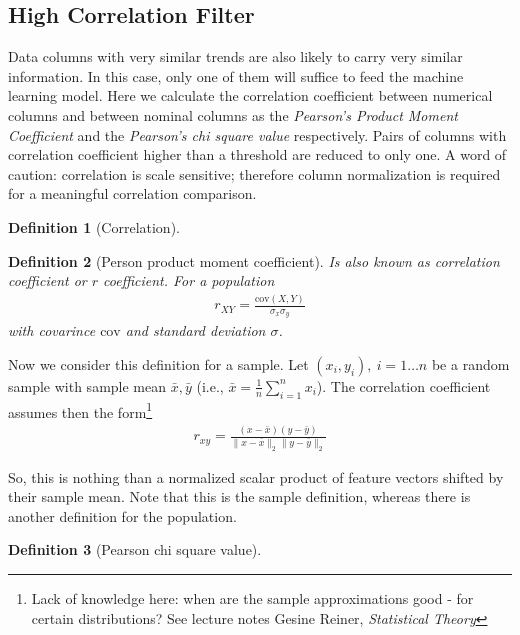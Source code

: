 \documentclass[10pt,a4paper]{article}
\newtheorem{definition}{Definition}
\begin{document}
\subsection*{High Correlation Filter}
Data columns with very similar trends are also likely to carry very similar information. In this case, only one of them will suffice to feed the machine learning model. Here we calculate the correlation coefficient between numerical columns and between nominal columns as the \textit{Pearson’s Product Moment Coefficient} and the \textit{Pearson's chi square value} respectively. Pairs of columns with correlation coefficient higher than a threshold are reduced to only one. A word of caution: correlation is scale sensitive; therefore column normalization is required for a meaningful correlation comparison.

\begin{definition}[Correlation]
\end{definition}


\begin{definition}[Person product moment coefficient] Is also known as correlation coefficient or $r$ coefficient. For a population
\begin{align}
r_{XY} = \frac{\text{cov}(X,Y)}{\sigma_x \sigma_y}
\end{align}
with covarince $\text{cov}$ and standard deviation $\sigma$.
\end{definition}
Now we consider this definition for a sample. Let $(x_i, y_i), ~ i = 1 \dots n$  be a random sample  with sample mean $\bar x, \bar y$  (i.e., $\bar x = \frac{1}{n} \sum_{i=1}^n x_i$). The correlation coefficient assumes then the form\footnote{Lack of knowledge here: when are the sample approximations good - for certain distributions? See lecture notes Gesine Reiner, \textit{Statistical Theory}}
\begin{align}
r_{xy} = \frac{\left(x-\bar x\right)\left(y-\bar y\right)}{\lVert x-\bar x \rVert_2 \lVert y-\bar y \rVert_2}
\end{align}

So, this is nothing than a normalized scalar product of feature vectors shifted by their sample mean. Note that this is the sample definition, whereas there is another definition for the population.

\begin{definition}[Pearson chi square value]
\end{definition}
\end{document}
